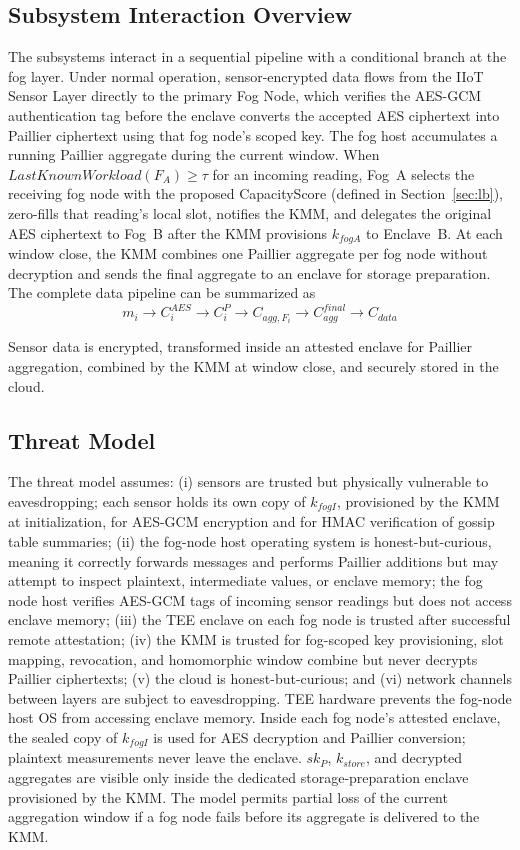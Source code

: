 \documentclass[conference]{IEEEtran}
\begin{document}
    \subsection{Subsystem Interaction Overview}
    The subsystems interact in a sequential pipeline with a conditional branch at the fog layer. Under normal operation, sensor-encrypted data flows from the IIoT Sensor Layer directly to the primary Fog Node, which verifies the AES-GCM authentication tag before the enclave converts the accepted AES ciphertext into Paillier ciphertext using that fog node's scoped key. The fog host accumulates a running Paillier aggregate during the current window. When $LastKnownWorkload(F_A) \geq \tau$ for an incoming reading, Fog~A selects the receiving fog node with the proposed CapacityScore (defined in Section~\ref{sec:lb}), zero-fills that reading's local slot, notifies the KMM, and delegates the original AES ciphertext to Fog~B after the KMM provisions $k_{fogA}$ to Enclave~B. At each window close, the KMM combines one Paillier aggregate per fog node without decryption and sends the final aggregate to an enclave for storage preparation. The complete data pipeline can be summarized as
    \begin{equation}
    m_i \rightarrow C_i^{AES} \rightarrow C_i^P \rightarrow C_{agg,F_i} \rightarrow C_{agg}^{final} \rightarrow C_{data}
    \end{equation}

    Sensor data is encrypted, transformed inside an attested enclave for Paillier aggregation, combined by the KMM at window close, and securely stored in the cloud.


    \subsection{Threat Model}
    The threat model assumes: (i) sensors are trusted but physically vulnerable to eavesdropping; each sensor holds its own copy of $k_{fogI}$, provisioned by the KMM at initialization, for AES-GCM encryption and for HMAC verification of gossip table summaries; (ii) the fog-node host operating system is honest-but-curious, meaning it correctly forwards messages and performs Paillier additions but may attempt to inspect plaintext, intermediate values, or enclave memory; the fog node host verifies AES-GCM tags of incoming sensor readings but does not access enclave memory; (iii) the TEE enclave on each fog node is trusted after successful remote attestation; (iv) the KMM is trusted for fog-scoped key provisioning, slot mapping, revocation, and homomorphic window combine but never decrypts Paillier ciphertexts; (v) the cloud is honest-but-curious; and (vi) network channels between layers are subject to eavesdropping. TEE hardware prevents the fog-node host OS from accessing enclave memory. Inside each fog node's attested enclave, the sealed copy of $k_{fogI}$ is used for AES decryption and Paillier conversion; plaintext measurements never leave the enclave. $sk_P$, $k_{store}$, and decrypted aggregates are visible only inside the dedicated storage-preparation enclave provisioned by the KMM. The model permits partial loss of the current aggregation window if a fog node fails before its aggregate is delivered to the KMM.
\end{document}
